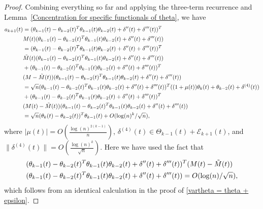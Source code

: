 \documentclass{amsart}
\numberwithin{equation}{section}
\begin{document}
\begin{proof}
    Combining everything so far and applying the three-term recurrence and Lemma~\ref{Concentration for specific functionals of theta}, we have
    \begin{equation*}
        \begin{split}
             a_{k+1}(t) &=(\theta_{k-1}(t)-\theta_{k-2}(t)^T \theta_{k-1}(t) \theta_{k-2}(t)+\delta''(t)+\delta'''(t))^T\\
             &M(t)(\theta_{k-1}(t)-\theta_{k-2}(t)^T \theta_{k-1}(t) \theta_{k-2}(t)+\delta''(t)+\delta'''(t))\\
             &=(\theta_{k-1}(t)-\theta_{k-2}(t)^T \theta_{k-1}(t) \theta_{k-2}(t)+\delta''(t)+\delta'''(t))^T\\
             &\Tilde{M}(t)(\theta_{k-1}(t)-\theta_{k-2}(t)^T \theta_{k-1}(t) \theta_{k-2}(t)+\delta''(t)+\delta'''(t))\\
             &+(\theta_{k-1}(t)-\theta_{k-2}(t)^T \theta_{k-1}(t) \theta_{k-2}(t)+\delta''(t)+\delta'''(t))^T\\
             &(M-\Tilde{M}(t))(\theta_{k-1}(t)-\theta_{k-2}(t)^T \theta_{k-1}(t) \theta_{k-2}(t)+\delta''(t)+\delta'''(t))\\
             &=\sqrt{n}(\theta_{k-1}(t)-\theta_{k-2}(t)^T \theta_{k-1}(t) \theta_{k-2}(t)+\delta''(t)+\delta'''(t))^T((1+\mu(t))\theta_{k}(t)+\theta_{k-2}(t)+\delta^{(4)}(t))\\
             &+(\theta_{k-1}(t)-\theta_{k-2}(t)^T \theta_{k-1}(t) \theta_{k-2}(t)+\delta''(t)+\delta'''(t))^T\\
             &(M(t)-\Tilde{M}(t))(\theta_{k-1}(t)-\theta_{k-2}(t)^T \theta_{k-1}(t) \theta_{k-2}(t)+\delta''(t)+\delta'''(t))\\
             &= \sqrt{n}(\theta_{k}(t)-\theta_{k-2}(t))^T\theta_{k-1}(t)+O(\log(n)^k/\sqrt{n}),
        \end{split}
    \end{equation*}
    where $|\mu(t)|=O(\frac{\log(n)^{2(k-1)}}{n})$, $\delta^{(4)}(t) \in \Theta_{k-1}(t)+\mathcal{E}_{k+1}(t)$, and $\|\delta^{(4)}(t)\|=O(\frac{\log(n)^k}{\sqrt{n}})$. Here we have used the fact that 
    \begin{equation*}
    \begin{split}
        &(\theta_{k-1}(t)-\theta_{k-2}(t)^T \theta_{k-1}(t) \theta_{k-2}(t)+\delta''(t)+\delta'''(t))^T(M(t)-\Tilde{M}(t))\\ 
        &(\theta_{k-1}(t)-\theta_{k-2}(t)^T \theta_{k-1}(t) \theta_{k-2}(t)+\delta''(t)+\delta'''(t))=O(\log(n)/\sqrt{n}),
    \end{split}
    \end{equation*} 
    which follows from an identical calculation in the proof of \eqref{vartheta = theta + epsilon}.
\end{proof}
\end{document}
